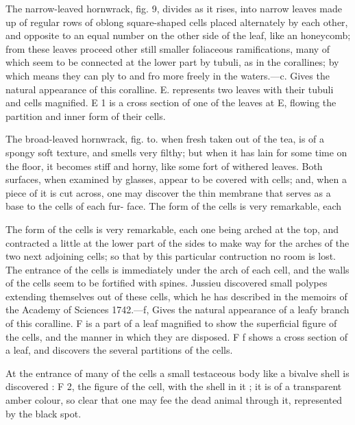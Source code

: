 \documentclass{article}
\begin{document}
The narrow-leaved hornwrack, fig. 9, divides as it
rises, into narrow leaves made up of regular rows of
oblong square-shaped cells placed alternately by each
other, and opposite to an equal number on the other
side of the leaf, like an honeycomb; from these leaves
proceed other still smaller foliaceous ramifications,
many of which seem to be connected at the lower part
by tubuli, as in the corallines; by which means they
can ply to and fro more freely in the waters.—c. Gives
the natural appearance of this coralline. E. represents
two leaves with their tubuli and cells magnified. E 1
is a cross section of one of the leaves at E, flowing the
partition and inner form of their cells.

The broad-leaved hornwrack, fig. to. when fresh taken out of the tea, is of a spongy soft texture, and smells very filthy; but when it has lain for some time on the floor, it becomes stiff and horny, like some fort of withered leaves. Both surfaces, when examined by glasses, appear to be covered with cells; and, when a piece of it is cut across, one may discover the thin membrane that serves as a base to the cells of each fur- face. The form of the cells is very remarkable, each

The form of the cells is very remarkable, each one being arched at the top, and contracted a little at the lower part of the sides to make way for the arches of the two next adjoining cells; so that by this particular contruction no room is lost. The entrance of the cells is immediately under the arch of each cell, and the walls of the cells seem to be fortified with spines. Jussieu discovered small polypes extending themselves out of these cells, which he has described in the memoirs of the Academy of Sciences 1742.—f, Gives the natural appearance of a leafy branch of this coralline. F is a part of a leaf magnified to show the superficial figure of the cells, and the manner in which they are disposed. F f shows a cross section of a leaf, and discovers the several partitions of the cells.

At the entrance of many of the cells a small testaceous body like a bivalve shell is discovered : F 2, the figure of the cell, with the shell in it ; it is of a transparent amber colour, so clear that one may fee the dead animal through it, represented by the black spot.
\end{document}
